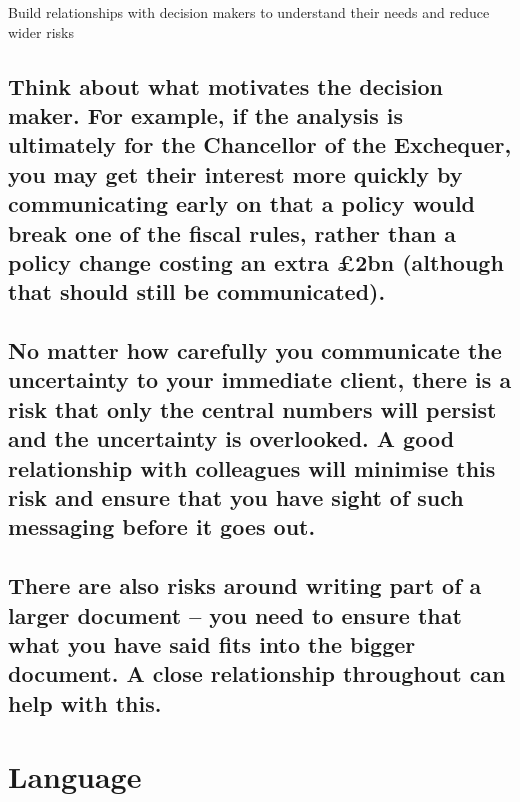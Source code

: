 \documentclass[]{book}
\begin{document}
 Build relationships with decision makers to understand their needs and
reduce wider risks

\subsection{Think about what motivates the decision maker. For example,
if the analysis is ultimately for the Chancellor of the Exchequer, you
may get their interest more quickly by communicating early on that a
policy would break one of the fiscal rules, rather than a policy change
costing an extra £2bn (although that should still be
communicated).}\label{think-about-what-motivates-the-decision-maker.-for-example-if-the-analysis-is-ultimately-for-the-chancellor-of-the-exchequer-you-may-get-their-interest-more-quickly-by-communicating-early-on-that-a-policy-would-break-one-of-the-fiscal-rules-rather-than-a-policy-change-costing-an-extra-2bn-although-that-should-still-be-communicated.}

\subsection{No matter how carefully you communicate the uncertainty to
your immediate client, there is a risk that only the central numbers
will persist and the uncertainty is overlooked. A good relationship with
colleagues will minimise this risk and ensure that you have sight of
such messaging before it goes
out.}\label{no-matter-how-carefully-you-communicate-the-uncertainty-to-your-immediate-client-there-is-a-risk-that-only-the-central-numbers-will-persist-and-the-uncertainty-is-overlooked.-a-good-relationship-with-colleagues-will-minimise-this-risk-and-ensure-that-you-have-sight-of-such-messaging-before-it-goes-out.}

\subsection{There are also risks around writing part of a larger
document -- you need to ensure that what you have said fits into the
bigger document. A close relationship throughout can help with
this.}\label{there-are-also-risks-around-writing-part-of-a-larger-document-you-need-to-ensure-that-what-you-have-said-fits-into-the-bigger-document.-a-close-relationship-throughout-can-help-with-this.}

\section{Language}\label{language}
\end{document}
